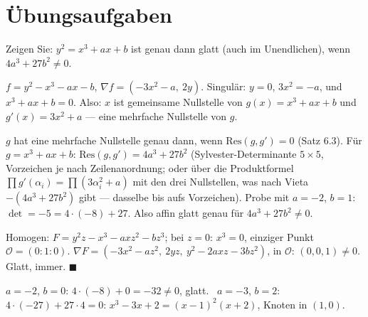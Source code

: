 \section{Übungsaufgaben}

\begin{aufgabe}
Zeigen Sie: $y^{2} = x^{3} + ax + b$ ist genau dann glatt (auch im Unendlichen), wenn $4a^{3} + 27b^{2}\ne0$.

\loesung
{}
$f = y^{2} - x^{3} - ax - b$, $\nabla f = (-3x^{2} - a,\ 2y)$. Singulär: $y = 0$, $3x^{2} = -a$, und $x^{3} + ax + b = 0$. Also: $x$ ist gemeinsame Nullstelle von $g(x) = x^{3} + ax + b$ und $g'(x) = 3x^{2} + a$ --- eine mehrfache Nullstelle von $g$.

$g$ hat eine mehrfache Nullstelle genau dann, wenn $\mathrm{Res}(g, g') = 0$ (Satz 6.3). Für $g = x^{3} + ax + b$: $\mathrm{Res}(g, g') = 4a^{3} + 27b^{2}$ (Sylvester-Determinante $5\times5$, Vorzeichen je nach Zeilenanordnung; oder über die Produktformel $\prod g'(\alpha_i) = \prod(3\alpha_i^{2} + a)$ mit den drei Nullstellen, was nach Vieta $-(4a^{3} + 27b^{2})$ gibt --- dasselbe bis aufs Vorzeichen). Probe mit $a = -2$, $b = 1$: $\det = -5 = 4\cdot(-8) + 27$. \checkmark Also affin glatt genau für $4a^{3} + 27b^{2}\ne0$.

Homogen: $F = y^{2}z - x^{3} - axz^{2} - bz^{3}$; bei $z = 0$: $x^{3} = 0$, einziger Punkt $\mathcal O = (0 : 1 : 0)$. $\nabla F = (-3x^{2} - az^{2},\ 2yz,\ y^{2} - 2axz - 3bz^{2})$, in $\mathcal O$: $(0, 0, 1)\ne0$. Glatt, immer. $\blacksquare$

$a = -2$, $b = 0$: $4\cdot(-8) + 0 = -32\ne0$, glatt. \checkmark\ $a = -3$, $b = 2$: $4\cdot(-27) + 27\cdot4 = 0$: $x^{3} - 3x + 2 = (x - 1)^{2}(x + 2)$, Knoten in $(1, 0)$. \checkmark

\begin{center}
\begin{minipage}{0.88\textwidth}
\end{minipage}
\end{center}
\end{aufgabe}

